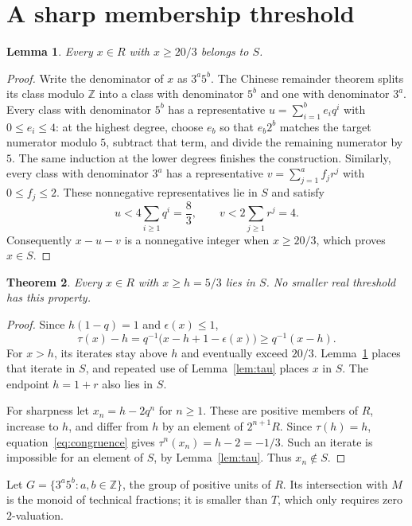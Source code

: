 \documentclass[11pt]{article}
\newtheorem{theorem}{Theorem}[section]
\newtheorem{lemma}[theorem]{Lemma}
\theoremstyle{definition}
\newcommand{\ZZ}{\mathbb Z}
\begin{document}
\section{A sharp membership threshold}
\begin{lemma}\label{lem:coarse}
Every $x\in R$ with $x\ge20/3$ belongs to $S$.
\end{lemma}
\begin{proof}
Write the denominator of $x$ as $3^a5^b$. The Chinese remainder theorem
splits its class modulo $\ZZ$ into a class with denominator $5^b$ and
one with denominator $3^a$.
Every class with denominator $5^b$ has a representative
$u=\sum_{i=1}^b e_iq^i$ with $0\le e_i\le4$: at the highest degree,
choose $e_b$ so that $e_b2^b$ matches the target numerator modulo $5$,
subtract that term, and divide the remaining numerator by $5$.
The same induction at the lower degrees finishes the construction.
Similarly, every class with denominator $3^a$ has a representative
$v=\sum_{j=1}^a f_jr^j$ with $0\le f_j\le2$.
These nonnegative representatives lie in $S$ and satisfy
\[
 u<4\sum_{i\ge1}q^i=\frac83,
 \qquad v<2\sum_{j\ge1}r^j=4.
\]
Consequently $x-u-v$ is a nonnegative integer when $x\ge20/3$,
which proves $x\in S$.
\end{proof}

\begin{theorem}\label{thm:conductor}
Every $x\in R$ with $x\ge h=5/3$ lies in $S$.
No smaller real threshold has this property.
\end{theorem}
\begin{proof}
Since $h(1-q)=1$ and $\epsilon(x)\le1$,
\begin{equation}\label{eq:growth}
 \tau(x)-h=q^{-1}\bigl(x-h+1-\epsilon(x)\bigr)
 \ge q^{-1}(x-h).
\end{equation}
For $x>h$, its iterates stay above $h$ and eventually exceed $20/3$.
Lemma~\ref{lem:coarse} places that iterate in $S$, and repeated use of
Lemma~\ref{lem:tau} places $x$ in $S$. The endpoint $h=1+r$ also lies
in $S$.

For sharpness let $x_n=h-2q^n$ for $n\ge1$. These are positive
members of $R$, increase to $h$, and differ from $h$ by an element
of $2^{n+1}R$. Since $\tau(h)=h$, equation~\eqref{eq:congruence} gives
$\tau^n(x_n)=h-2=-1/3$. Such an iterate is impossible for an element
of $S$, by Lemma~\ref{lem:tau}. Thus $x_n\notin S$.
\end{proof}

Let $G=\{3^a5^b:a,b\in\ZZ\}$, the group of positive units of $R$.
Its intersection with $M$ is the monoid of technical fractions; it is
smaller than $T$, which only requires zero $2$-valuation.
\end{document}

